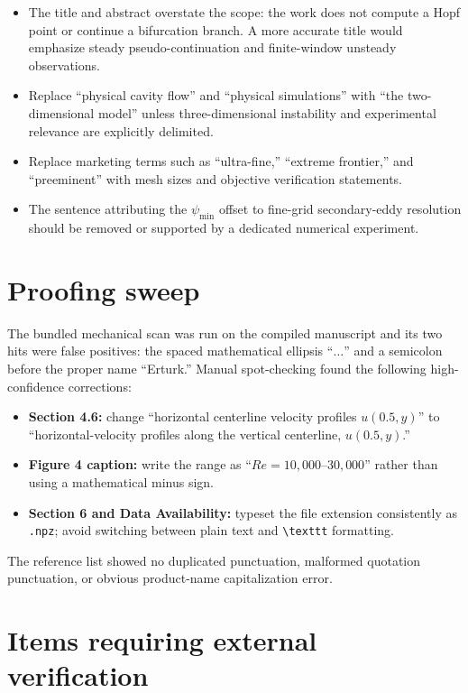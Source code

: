 \documentclass[11pt]{article}
\newcommand{\Rey}{\mathit{Re}}
\begin{document}
\begin{itemize}
    \item The title and abstract overstate the scope: the work does not compute a Hopf point or continue a bifurcation branch. A more accurate title would emphasize steady pseudo-continuation and finite-window unsteady observations.
    \item Replace ``physical cavity flow'' and ``physical simulations'' with ``the two-dimensional model'' unless three-dimensional instability and experimental relevance are explicitly delimited.
    \item Replace marketing terms such as ``ultra-fine,'' ``extreme frontier,'' and ``preeminent'' with mesh sizes and objective verification statements.
    \item The sentence attributing the $\psi_{\min}$ offset to fine-grid secondary-eddy resolution should be removed or supported by a dedicated numerical experiment.
\end{itemize}

\section*{Proofing sweep}

The bundled mechanical scan was run on the compiled manuscript and its two hits were false positives: the spaced mathematical ellipsis ``$\ldots$'' and a semicolon before the proper name ``Erturk.'' Manual spot-checking found the following high-confidence corrections:

\begin{itemize}
    \item \textbf{Section 4.6:} change ``horizontal centerline velocity profiles $u(0.5,y)$'' to ``horizontal-velocity profiles along the vertical centerline, $u(0.5,y)$.''
    \item \textbf{Figure 4 caption:} write the range as ``$\Rey=10{,}000$--$30{,}000$'' rather than using a mathematical minus sign.
    \item \textbf{Section 6 and Data Availability:} typeset the file extension consistently as \texttt{.npz}; avoid switching between plain text and \verb|\texttt| formatting.
\end{itemize}

The reference list showed no duplicated punctuation, malformed quotation punctuation, or obvious product-name capitalization error.

\section*{Items requiring external verification}
\end{document}
